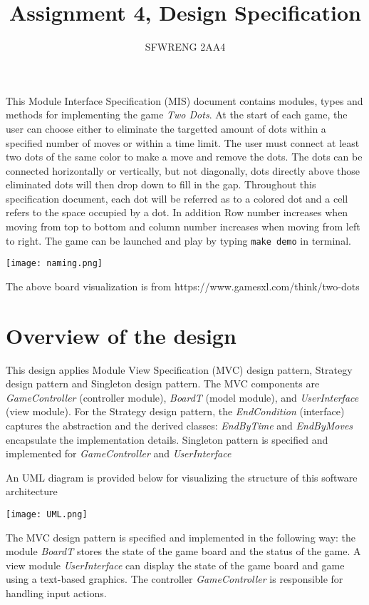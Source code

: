 \documentclass[12pt]{article}
\title{Assignment 4, Design Specification}
\author{SFWRENG 2AA4}
\begin{document}
\maketitle
This Module Interface Specification (MIS) document contains modules, types and
methods for implementing the game \textit{Two Dots}. At the start of each game, the user can choose
either to eliminate the targetted amount of dots within a specified number of moves or within a time limit.
The user must connect at least two dots of the same color to make a move and remove the dots. The dots can 
be connected horizontally or vertically, but not diagonally,
dots directly above those eliminated dots will then drop down to fill in the gap. Throughout this specification 
document, each dot will be referred as to a colored dot and a cell refers to the space occupied by a dot. In addition
Row number increases when moving from top to bottom and column number increases when moving from left to right. The 
game can be launched and play by typing \texttt{make demo} in terminal.

\begin{center}
  \texttt{[image: naming.png]}

  The above board visualization is from https://www.gamesxl.com/think/two-dots
\end{center}

\newpage

\section{Overview of the design}

This design applies Module View Specification (MVC) design pattern, Strategy design pattern and Singleton design pattern. The MVC components
are \textit{GameController} (controller module), \textit{BoardT} (model module), and \textit{UserInterface} (view module). For the Strategy design pattern,
the \textit{EndCondition} (interface) captures the abstraction and the derived classes: \textit{EndByTime} and \textit{EndByMoves} encapsulate the implementation details.
Singleton pattern is specified and implemented for \textit{GameController} and \textit{UserInterface}

\bigskip

\noindent An UML diagram is provided below for visualizing the structure of this software architecture

\texttt{[image: UML.png]}

\medskip
The MVC design pattern is specified and implemented in the following way: the module \textit{BoardT}
stores the state of the game board and the status of the game. A view module \textit{UserInterface} can display
the state of the game board and game using a text-based graphics. The controller \textit{GameController}
is responsible for handling input actions. 
\end{document}
